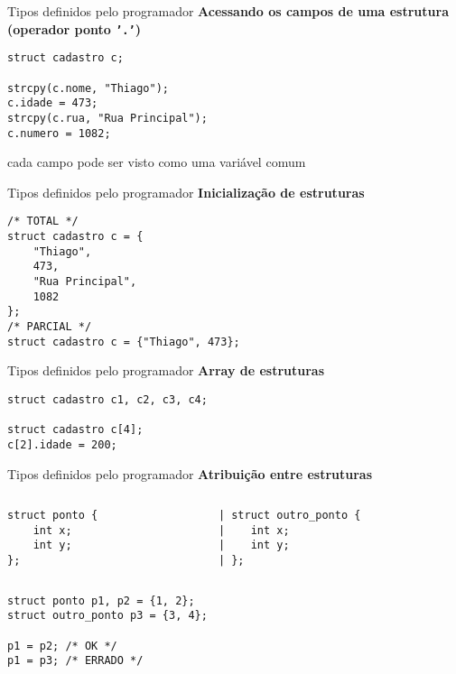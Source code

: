 \documentclass[10pt]{beamer}
\begin{document}
\begin{frame}[fragile]{Tipos definidos pelo programador}
    \huge
    \textbf{Acessando os campos de uma estrutura (operador ponto \texttt{'.'})}
    
    \bigskip
    
    \large
    \begin{verbatim}
struct cadastro c;

strcpy(c.nome, "Thiago");
c.idade = 473;
strcpy(c.rua, "Rua Principal");
c.numero = 1082;
    \end{verbatim}
    
    \vfill
    
    cada campo pode ser visto como uma variável comum
\end{frame}

\begin{frame}[fragile]{Tipos definidos pelo programador}
    \huge
    \textbf{Inicialização de estruturas}
    
    \large
    \begin{verbatim}
/* TOTAL */
struct cadastro c = {
    "Thiago",
    473,
    "Rua Principal",
    1082
};
/* PARCIAL */
struct cadastro c = {"Thiago", 473};
    \end{verbatim}
\end{frame}

\begin{frame}[fragile]{Tipos definidos pelo programador}
    \huge
    \textbf{Array de estruturas}

    \bigskip
    
    \Large
    \begin{verbatim}
struct cadastro c1, c2, c3, c4;

struct cadastro c[4];
c[2].idade = 200;
    \end{verbatim}
\end{frame}

\begin{frame}[fragile]{Tipos definidos pelo programador}
    \huge
    \textbf{Atribuição entre estruturas}
    
    \bigskip
    
    \large
    \begin{columns}
    \begin{column}{0.35\textwidth}
        \begin{verbatim}
struct ponto {
    int x;
    int y;
};
        \end{verbatim}
    \end{column}
    \begin{column}{0.55\textwidth}
        \begin{verbatim}
| struct outro_ponto {
|    int x;
|    int y;
| };
        \end{verbatim}
    \end{column}
    \end{columns}

    \begin{verbatim}
struct ponto p1, p2 = {1, 2};
struct outro_ponto p3 = {3, 4};

p1 = p2; /* OK */
p1 = p3; /* ERRADO */
    \end{verbatim}
\end{frame}
\end{document}
